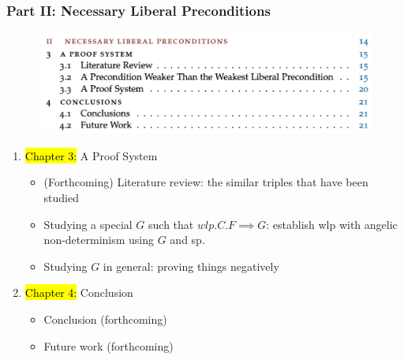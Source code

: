 \documentclass[aspectratio=169]{beamer}
\begin{document}
\begin{frame}[fragile]
	\frametitle{Part II: Necessary Liberal Preconditions}
	\begin{minipage}[t]{0.49\linewidth}	
		\begin{figure}
		\centering \includegraphics[width=1.1\textwidth]{images/part2.png} 
	  \end{figure}
	\end{minipage}
	\begin{minipage}[t]{0.5\linewidth}
		\begin{enumerate}
				\item[] \hl{Chapter 3: }A Proof System
				\begin{itemize}
					\item (Forthcoming) Literature review: the similar triples that have been studied
					\item Studying a special $G$ such that $wlp.C.F \implies G$: establish wlp with angelic non-determinism using $G$ and sp. 
					\item Studying $G$ in general: proving things negatively
				\end{itemize}
			\item[] \hl{Chapter 4: }Conclusion
				\begin{itemize}
					\item Conclusion (forthcoming)
					\item Future work (forthcoming)
				\end{itemize}
	\end{enumerate}
	\end{minipage}
	
\end{frame}
\end{document}
